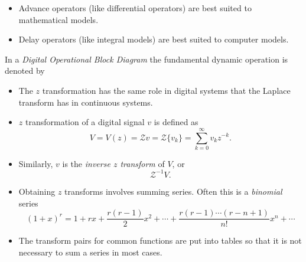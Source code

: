 \begin{slide}
  \label{slide:l7s6}
  \begin{itemize}
  \item Advance operators (like differential operators) are best suited
    to mathematical models.
  \item Delay operators (like integral models) are best suited to
    computer models.
  \end{itemize}
  In a \emph{Digital Operational Block Diagram} the fundamental
  dynamic operation is denoted by
  \begin{center}\end{center}
\end{slide}



\begin{slide}\label{slide:l8s1}
\begin{itemize}
 \item The $z$ transformation has the same role in digital systems
 that the Laplace transform has in continuous systems.
 \item $z$ transformation of a digital signal $v$ is defined as \[V =
 V(z) = \mathcal{Z} v = \mathcal{Z} \{ v_{k} \}=\sum_{k=0}^{\infty}
 v_k z^{-k}.\]

 \item Similarly, $v$ is the \emph{inverse $z$
 transform} of $V$, or
   \[\mathcal{Z}^{-1} V.\]

\end{itemize}

\end{slide}


\begin{slide}\label{slide:l8s1a}

\begin{itemize}

\item Obtaining $z$ transforms involves summing series. Often this is a
\emph{binomial} series \[(1+x)^r = 1 + rx + \frac{r(r-1)}{2}x^2 +
\cdots + \frac{r(r-1)\cdots(r-n+1)}{n!}x^n + \cdots\]

\item The transform pairs for common functions
are put into tables so that it is not necessary to sum a series in
most cases.

\end{itemize}

\end{slide}

